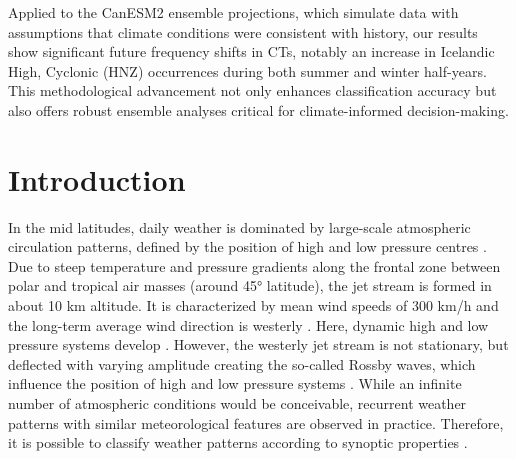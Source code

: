 \documentclass[
]{krantz}
\begin{document}
Applied to the CanESM2 ensemble projections, which simulate data with assumptions that climate conditions were consistent with history, our results show significant future frequency shifts in CTs, notably an increase in Icelandic High, Cyclonic (HNZ) occurrences during both summer and winter half-years. This methodological advancement not only enhances classification accuracy but also offers robust ensemble analyses critical for climate-informed decision-making.

\section{Introduction}\label{introduction}

In the mid latitudes, daily weather is dominated by large-scale atmospheric circulation patterns,
defined by the position of high and low pressure centres \citep{Hackel2021, Mittermeier2022}.
Due to steep temperature and pressure gradients along the frontal zone between polar and tropical air masses (around 45° latitude),
the jet stream is formed in about 10 km altitude.
It is characterized by mean wind speeds of 300 km/h and the long-term average wind direction is westerly \citep{Hackel2021}.
Here, dynamic high and low pressure systems develop \citep{Hackel2021, Mittermeier2022}.
However, the westerly jet stream is not stationary, but deflected with varying amplitude creating the so-called Rossby waves,
which influence the position of high and low pressure systems \citep{Hackel2021}.
While an infinite number of atmospheric conditions would be conceivable, recurrent weather patterns with similar meteorological features are observed in practice.
Therefore, it is possible to classify weather patterns according to synoptic properties \citep{Bissolli2001b}.
\end{document}
